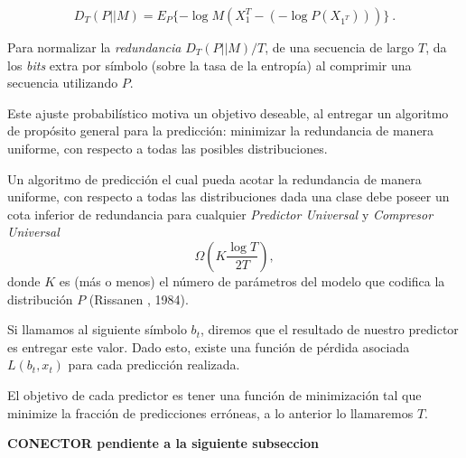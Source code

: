\begin{equation}
D_{T} ( P || M ) = E_{P} \{ - \log M(X_{1}^{T} - (- \log P(X_{1^{T}})   )  )       \} \ .
\end{equation}
 

Para normalizar la \emph{redundancia} $D_{T} ( P || M ) / T $, de una secuencia de largo $T$, da los  \emph{bits} extra por símbolo (sobre la tasa de la entropía) al comprimir una secuencia utilizando $P$.  

Este ajuste probabilístico motiva un objetivo deseable, al entregar un algoritmo de propósito general para la predicción: minimizar la redundancia de manera uniforme, con respecto a todas las posibles distribuciones. 

Un algoritmo de predicción el cual pueda acotar la redundancia de manera uniforme, con respecto a todas las distribuciones dada una clase debe poseer un cota inferior de redundancia para cualquier \emph{Predictor Universal} y \emph{Compresor Universal} \begin{equation}
\Omega \left(  K \dfrac{\log T}{2 T } \right),
\end{equation} donde $K$ es (más o menos) el número de parámetros del modelo que codifica la distribución $P$ (Rissanen \cite{Rissanen1984}, 1984).






 

Si llamamos al siguiente símbolo $b_{t}$, diremos que el resultado de nuestro predictor es entregar este valor. Dado esto, existe una función de pérdida asociada $L( b_{t},x_{t} )$ para cada predicción realizada. 

El objetivo de cada predictor es tener una función de minimización tal que minimize la fracción de predicciones erróneas, a lo anterior lo llamaremos $T$.%













\textbf{CONECTOR pendiente a la siguiente subseccion}